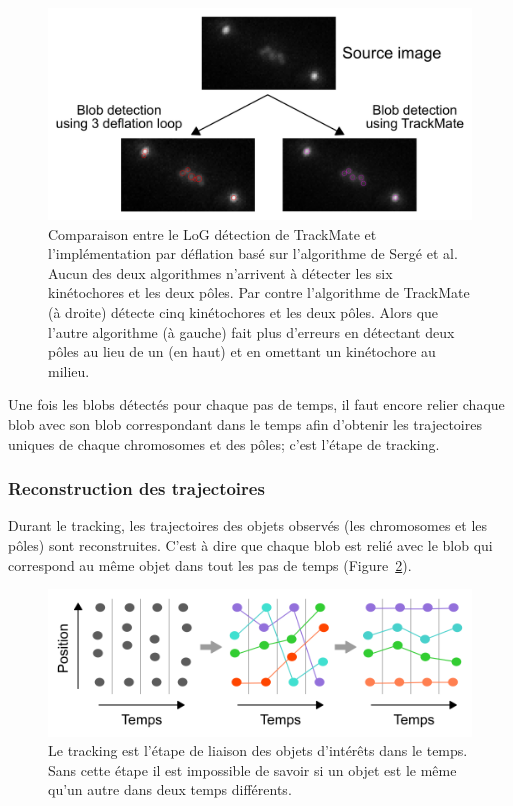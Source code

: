 \documentclass[12pt,a4paper,twoside,openright]{book}
\begin{document}
\begin{figure}[htbp]
\centering
\includegraphics{figures/results/imaging/compare.png}
\caption{\label{fig:compare}Comparaison entre le LoG détection de
TrackMate et l'implémentation par déflation basé sur l'algorithme de
Sergé et al. Aucun des deux algorithmes n'arrivent à détecter les six
kinétochores et les deux pôles. Par contre l'algorithme de TrackMate (à
droite) détecte cinq kinétochores et les deux pôles. Alors que l'autre
algorithme (à gauche) fait plus d'erreurs en détectant deux pôles au
lieu de un (en haut) et en omettant un kinétochore au milieu.}
\end{figure}

Une fois les blobs détectés pour chaque pas de temps, il faut encore
relier chaque blob avec son blob correspondant dans le temps afin
d'obtenir les trajectoires uniques de chaque chromosomes et des pôles;
c'est l'étape de tracking.

\subsubsection{Reconstruction des
trajectoires}\label{reconstruction-des-trajectoires}

Durant le tracking, les trajectoires des objets observés (les
chromosomes et les pôles) sont reconstruites. C'est à dire que chaque
blob est relié avec le blob qui correspond au même objet dans tout les
pas de temps (Figure~\ref{fig:whatistracking}).

\begin{figure}[htbp]
\centering
\includegraphics{figures/results/imaging/whatistracking.png}
\caption{\label{fig:whatistracking}Le tracking est l'étape de liaison
des objets d'intérêts dans le temps. Sans cette étape il est impossible
de savoir si un objet est le même qu'un autre dans deux temps
différents.}
\end{figure}
\end{document}
